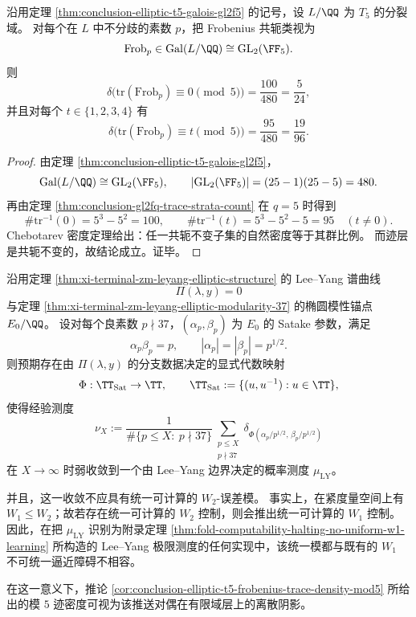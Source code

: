 \begin{corollary}\label{cor:conclusion-elliptic-t5-frobenius-trace-density-mod5}
沿用定理 \ref{thm:conclusion-elliptic-t5-galois-gl2f5} 的记号，设 \(L/\QQ\) 为 \(T_5\) 的分裂域。
对每个在 \(L\) 中不分歧的素数 \(p\)，把 Frobenius 共轭类视为
\[
\mathrm{Frob}_p\in \mathrm{Gal}(L/\QQ)\cong \mathrm{GL}_2(\FF_5).
\]
则
\[
\delta\bigl(\mathrm{tr}(\mathrm{Frob}_p)\equiv 0\!\!\pmod 5\bigr)=\frac{100}{480}=\frac{5}{24},
\]
并且对每个 \(t\in\{1,2,3,4\}\) 有
\[
\delta\bigl(\mathrm{tr}(\mathrm{Frob}_p)\equiv t\!\!\pmod 5\bigr)=\frac{95}{480}=\frac{19}{96}.
\]
\end{corollary}
\begin{proof}
由定理 \ref{thm:conclusion-elliptic-t5-galois-gl2f5}，
\[
\mathrm{Gal}(L/\QQ)\cong \mathrm{GL}_2(\FF_5),
\qquad
|\mathrm{GL}_2(\FF_5)|=(25-1)(25-5)=480.
\]
再由定理 \ref{thm:conclusion-gl2fq-trace-strata-count} 在 \(q=5\) 时得到
\[
\#\mathrm{tr}^{-1}(0)=5^3-5^2=100,
\qquad
\#\mathrm{tr}^{-1}(t)=5^3-5^2-5=95\quad(t\neq 0).
\]
Chebotarev 密度定理给出：任一共轭不变子集的自然密度等于其群比例。
而迹层是共轭不变的，故结论成立。证毕。
\end{proof}

\begin{conjecture}\label{conj:conclusion-leyang-gl2-satake-boundary-duality}
沿用定理 \ref{thm:xi-terminal-zm-leyang-elliptic-structure} 的 Lee--Yang 谱曲线
\[
\Pi(\lambda,y)=0
\]
与定理 \ref{thm:xi-terminal-zm-leyang-elliptic-modularity-37} 的椭圆模性锚点 \(E_0/\QQ\)。
设对每个良素数 \(p\nmid 37\)，\((\alpha_p,\beta_p)\) 为 \(E_0\) 的 Satake 参数，满足
\[
\alpha_p\beta_p=p,
\qquad
|\alpha_p|=|\beta_p|=p^{1/2}.
\]
则预期存在由 \(\Pi(\lambda,y)\) 的分支数据决定的显式代数映射
\[
\Phi:\TT_{\mathrm{Sat}}\to \TT,
\qquad
\TT_{\mathrm{Sat}}:=\{(u,u^{-1}):u\in\TT\},
\]
使得经验测度
\[
\nu_X
:=
\frac{1}{\#\{p\le X:\ p\nmid 37\}}
\sum_{\substack{p\le X\\ p\nmid 37}}
\delta_{\Phi(\alpha_p/p^{1/2},\,\beta_p/p^{1/2})}
\]
在 \(X\to\infty\) 时弱收敛到一个由 Lee--Yang 边界决定的概率测度 \(\mu_{\mathrm{LY}}\)。

并且，这一收敛不应具有统一可计算的 \(W_2\)-误差模。
事实上，在紧度量空间上有 \(W_1\le W_2\)；故若存在统一可计算的 \(W_2\) 控制，则会推出统一可计算的 \(W_1\) 控制。
因此，在把 \(\mu_{\mathrm{LY}}\) 识别为附录定理 \ref{thm:fold-computability-halting-no-uniform-w1-learning} 所构造的 Lee--Yang 极限测度的任何实现中，该统一模都与既有的 \(W_1\) 不可统一逼近障碍不相容。

在这一意义下，推论 \ref{cor:conclusion-elliptic-t5-frobenius-trace-density-mod5} 所给出的模 \(5\) 迹密度可视为该推送对偶在有限域层上的离散阴影。
\end{conjecture}

